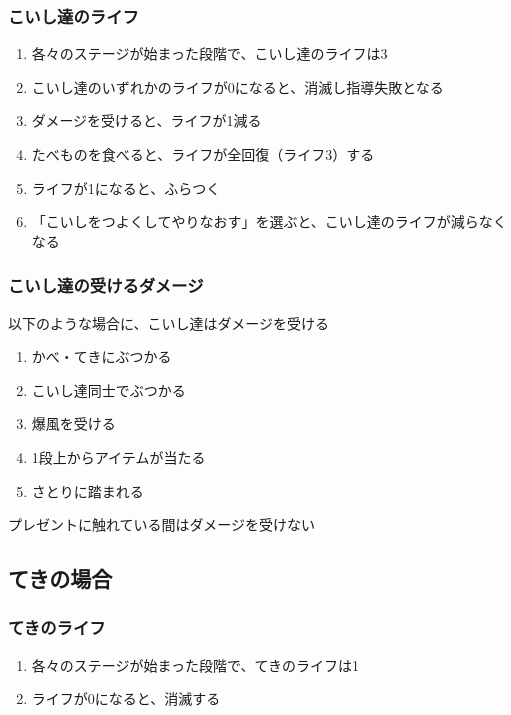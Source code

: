 \subsubsection{こいし達のライフ}
\begin{enumerate}[label={\sarrow}]
\item 各々のステージが始まった段階で、こいし達のライフは3
\item こいし達のいずれかのライフが0になると、消滅し指導失敗となる
\item ダメージを受けると、ライフが1減る
\item たべものを食べると、ライフが全回復（ライフ3）する
\item ライフが1になると、ふらつく
\item 「こいしをつよくしてやりなおす」を選ぶと、こいし達のライフが減らなくなる
\end{enumerate}

\subsubsection{こいし達の受けるダメージ}
以下のような場合に、こいし達はダメージを受ける
\begin{enumerate}[label={\sarrow}]
\item かべ・てきにぶつかる
\item こいし達同士でぶつかる
\item 爆風を受ける
\item 1段上からアイテムが当たる
\item さとりに踏まれる
\end{enumerate}
\begin{marker}
プレゼントに触れている間はダメージを受けない
\end{marker}


\subsection{てきの場合}

\subsubsection{てきのライフ}
\begin{enumerate}[label={\sarrow}]
\item 各々のステージが始まった段階で、てきのライフは1
\item ライフが0になると、消滅する
\end{enumerate}

